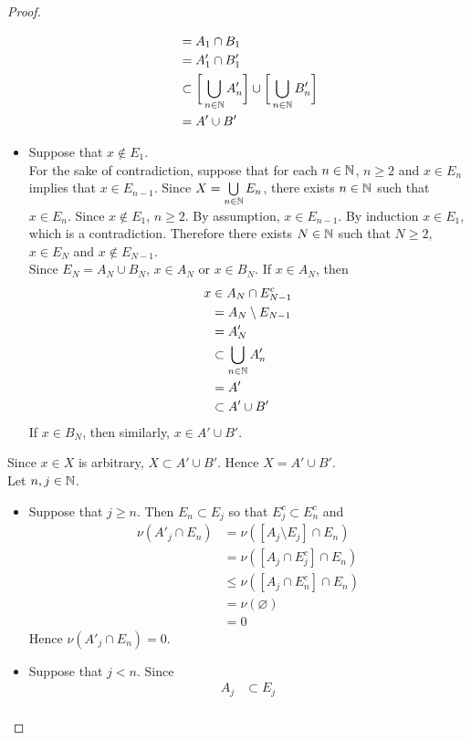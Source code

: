 \documentclass{book}
\begin{document}
\begin{proof}
\begin{itemize}
\begin{align*}
				& = A_1 \cap B_1 \\
				& = A'_1 \cap B'_1 \\
				& \subset \bigg[ \bigcup_{n \in \mathbb{N}} A'_n \bigg] \cup \bigg[ \bigcup_{n \in \mathbb{N}} B'_n \bigg] \\
				& = A' \cup B'
			\end{align*} 
			\item Suppose that $x \not \in E_1$. \\
			For the sake of contradiction, suppose that for each $n \in \mathbb{N}$, $n \geq 2$ and $x \in E_n$ implies that $x \in E_{n-1}$. Since $X = \bigcup\limits_{n \in \mathbb{N}} E_n$, there exists $n \in \mathbb{N}$ such that $x \in E_n$. Since $x \not \in E_1$, $n \geq 2$. By assumption, $x \in E_{n-1}$. By induction $x \in E_1$, which is a contradiction. Therefore there exists $N \in \mathbb{N}$ such that $N \geq 2$, $x \in E_N$ and $x \not \in E_{N-1}$. \\
			Since $E_N = A_N \cup B_N$, $x \in A_N$ or $x \in B_N$. If $x \in A_N$, then 
			\begin{align*}
				x
				& \in A_N \cap E_{N-1}^c \\
				& = A_N \setminus E_{N-1} \\
				& = A'_N \\
				& \subset \bigcup_{n \in \mathbb{N}} A'_n \\
				& = A' \\
				& \subset A' \cup B'
			\end{align*}
			If $x \in B_N$, then similarly, $x \in A' \cup B'$. 
		\end{itemize}
		Since $x \in X$ is arbitrary, $X \subset A' \cup B'$. Hence $X = A' \cup B'$. \\
		Let $n, j \in \mathbb{N}$. 
		\begin{itemize}
			\item Suppose that $j \geq n$. Then $E_n \subset E_j$ so that $E_j^c \subset E_n^c$ and
			\begin{align*}
				\nu(A'_j \cap E_n)
				& = \nu([A_j \setminus E_j] \cap E_n) \\
				& = \nu([A_j \cap E_j^c] \cap E_n) \\
				& \leq \nu([A_j \cap E_n^c] \cap E_n) \\ 
				& =  \nu(\varnothing) \\
				& = 0 
			\end{align*}
			Hence $\nu(A'_j \cap E_n) = 0$. 
			\item Suppose that $j < n$. Since 
			\begin{align*}
				A_j 
				& \subset E_j \\

\end{align*}
\end{itemize}
\end{proof}
\end{document}
